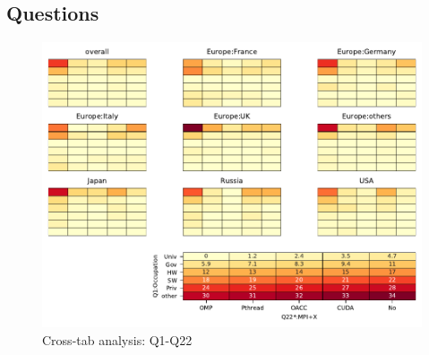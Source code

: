 
\subsection{Questions}


\begin{figure}
\begin{center}
\includegraphics[width=12cm]{../pdfs/Q1-Q22.pdf}
\caption{Cross-tab analysis: Q1-Q22}
\label{fig:Q1-Q22}
\end{center}
\end{figure}
